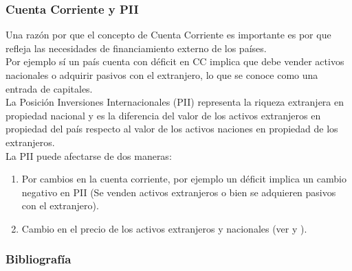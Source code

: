 \documentclass[10pt, xcolor=table, x11names]{beamer}
\begin{document}
	
	\begin{frame}[label=Cuenta Corriente y PNII]
		\frametitle{{\normalsize Cuenta Corriente y PII} {}}
			Una razón por que el concepto de Cuenta Corriente es importante es por que refleja las necesidades de financiamiento externo de los países.\\
			Por ejemplo sí un país cuenta con déficit en CC implica que debe vender activos nacionales o adquirir pasivos con el extranjero, lo que se conoce como una entrada de capitales.\\
			La Posición Inversiones Internacionales (PII) representa la riqueza extranjera en propiedad nacional y es la diferencia del valor de los activos extranjeros en propiedad del país respecto al valor de los activos naciones en propiedad de los extranjeros.\\
			La PII puede afectarse de dos maneras:
			\begin{enumerate}
				\item Por cambios en la cuenta corriente, por ejemplo un déficit implica un cambio negativo en PII (Se venden activos extranjeros o bien se adquieren pasivos con el extranjero).
				\item Cambio en el precio de los activos extranjeros y nacionales (ver \cite{Hausmann2006} y \cite{Milesi2008}).
			\end{enumerate}
		\end{frame}
		
	\begin{frame}
		\frametitle{{\large 
				Bibliografía}}
		\renewcommand{\refname}{Referencias}
		
		
	\end{frame}
	
	
	
	
	
	
\end{document}
